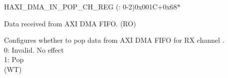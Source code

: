 \begin{register}{H}{AXI\_DMA\_IN\_POP\_CH\_REG (: 0-2)}{0x001C+0x68*}\label{regdesc:AXIDMAINPOPCHNREG}
%
%
%
\regnewline%
\begin{regdesc}\begin{reglist}
\label{fielddesc:AXIDMAINFIFORDATACHN}\item [AXI\_DMA\_INFIFO\_RDATA\_CH\regindex{n}] Data received from AXI DMA FIFO. (RO)
\label{fielddesc:AXIDMAINFIFOPOPCHN}\item [AXI\_DMA\_INFIFO\_POP\_CH\regindex{n}] Configures whether to pop data from AXI DMA FIFO for RX channel .\\0: Invalid. No effect\\1: Pop\\ (WT)
\end{reglist}\end{regdesc}
\end{register}


